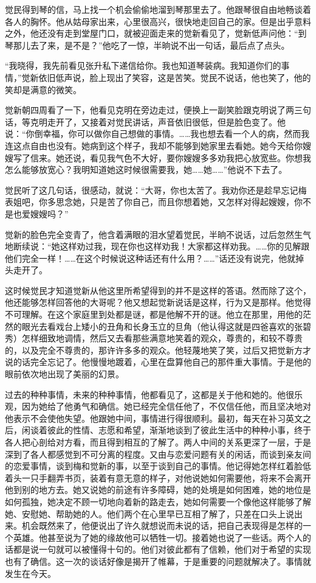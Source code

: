 \par 觉民得到琴的信，马上找一个机会偷偷地溜到琴那里去了。他跟琴很自由地畅谈着各人的胸怀。他从姑母家出来，心里很高兴，很快地走回自己的家。但是出乎意料之外，他还没有走到堂屋门口，就被迎面走来的觉新看见了，觉新低声问他：“到琴那儿去了来，是不是？”他吃了一惊，半晌说不出一句话，最后点了点头。
\par “我晓得，我先前看见张升私下递信给你。我也知道琴装病。我知道你们的事情，”觉新依旧低声说，脸上现出了笑容，这是苦笑。觉民不说话，他也笑了，他的笑却是满意的微笑。
\par 觉新朝四周看了一下，他看见克明在旁边走过，便换上一副笑脸跟克明说了两三句话，等克明走开了，又接着对觉民讲话，声音依旧很低，但是脸色变了。他说：“你倒幸福，你可以做你自己想做的事情。……我也想去看一个人的病，然而我连这点自由也没有。她病到这个样子，我却不能够到她家里去看她。她今天给你嫂嫂写了信来。她还说，看见我气色不大好，要你嫂嫂多多劝我把心放宽些。你想我怎么能够放宽心？我明知道她这时候很需要我，她……她……”他说不下去了。
\par 觉民听了这几句话，很感动，就说：“大哥，你也太苦了。我劝你还是趁早忘记梅表姐吧，你多思念她，只是苦了你自己，而且你想着她，又怎样对得起嫂嫂，你不是也爱嫂嫂吗？”
\par 觉新的脸色完全变青了，他含着满眼的泪水望着觉民，半晌不说话，过后忽然生气地断续说：“她这样劝过我，现在你也这样劝我！大家都这样劝我。……你的见解跟他们完全一样！……在这个时候说这种话还有什么用？……”话还没有说完，他就掉头走开了。
\par 这时候觉民才知道觉新从他这里所希望得到的并不是这样的答语。然而除了这个，他还能够怎样回答他的大哥呢？他又想起觉新说话是这样，行为又是那样。他觉得不可理解。在这个家庭里到处都是谜，都是他解不开的谜。他立在那里，用他的茫然的眼光去看戏台上矮小的丑角和长身玉立的旦角（他认得这就是四爸喜欢的张碧秀）怎样细致地调情，然后又去看那些满意地笑着的观众，尊贵的，和较不尊贵的，以及完全不尊贵的，那许许多多的观众。他轻蔑地笑了笑，过后又把觉新方才说的话完全忘记了。他慢慢地踱着，心里在盘算他自己的那件重大事情。于是他的眼前依次地出现了美丽的幻景。
\par 过去的种种事情，未来的种种事情，他都看见了，这都是关于他和她的。他很乐观，因为她给了他勇气和确信。她已经完全信任他了，不仅信任他，而且坚决地对他表示不会使他失望。他跟她中间，事情进行得很顺利。最初，每天在补习英文之后，闲谈着彼此的性情、志愿和希望，渐渐地谈到了彼此生活中的种种小事，终于各人把心剖给对方看，而且得到相互的了解了。两人中间的关系更深了一层，于是深到了各人都感觉到不可分离的程度。又由与恋爱问题有关的闲话，而谈到亲友间的恋爱事情，谈到梅和觉新的事，以至于谈到自己的事情。他记得她怎样红着脸低着头一只手翻弄书页，装着有意无意的样子，对他说她如何需要他，将来不会离开他到别的地方去。她又说她的前途有许多障碍，她的处境是如何困难，她的地位是如何孤独，她决定不顾一切地向着新的路走去，她如何需要一个像他这样能够了解她、安慰她、帮助她的人。他们两个在心里早已互相了解了，只差在口头上说出来。机会既然来了，他便说出了许久就想说而未说的话，把自己表现得是怎样的一个英雄。他甚至说为了她的缘故他可以牺牲一切。接着她也说了一些话。两个人的话都是说一句就可以被懂得十句的。他们对彼此都有了信赖，他们对于希望的实现也有了确信。这一次的谈话好像是揭开了帷幕，于是重要的问题就解决了。事情就发生在今天。
